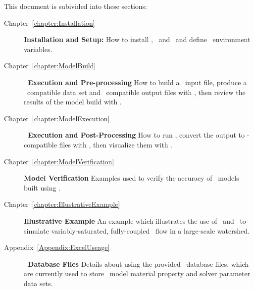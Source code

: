 This document is subivided into these sections:
\begin{description}
    \item[Chapter~\ref{chapter:Installation}]\textbf{Installation and Setup:} How to install \mut, \mfus\ and \tecplot\ and define \windows\ environment variables.
     \item[Chapter~\ref{chapter:ModelBuild}]\textbf{\mut\ Execution and Pre-processing} How to build a \mut\ input file, produce a \mfus\ compatible data set and \tecplot\ compatible output files with \mut, then review the results of the model build with \tecplot.
    \item[Chapter~\ref{chapter:ModelExecution}]\textbf{\mfus\ Execution and Post-Processing} How to run \mfus, convert the output to \tecplot-compatible files with \mut, then visualize them with \tecplot.
    \item[Chapter~\ref{chapter:ModelVerification}]\textbf{Model Verification} Examples used to verify the accuracy of \mfus\ models built using \mut.
    \item[Chapter~\ref{chapter:IllustrativeExample}]\textbf{Illustrative Example} An example which illustrates the use of \mut\ and \mfus\ to simulate variably-saturated, fully-coupled   \gwf\-\swf\ flow in a large-scale watershed.
    \item[Appendix~\ref{Appendix:ExcelUseage}]\textbf{\excel\ Database Files} Details about using the provided \excel\ database files, which are currently used to store \mfus\ model material property and solver parameter data sets.
        \end{description} 